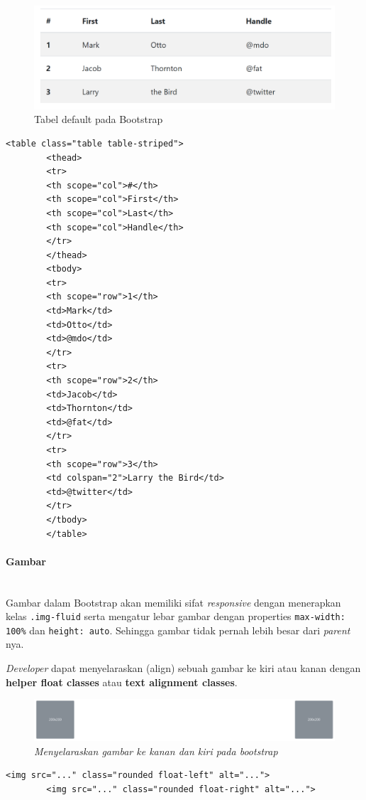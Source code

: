 \documentclass[a4paper,twoside]{article}
\newcommand{\myparagraph}[1]{\paragraph{#1}\mbox{}\\}
\begin{document}
\begin{enumerate}
		\begin{figure} [H]
			\centering  
			\includegraphics[scale=0.7]{tablestriped_bootstrap.png}  
			\caption{Tabel default pada Bootstrap} 
		\end{figure}
		
		\begin{lstlisting}[frame=single] 
		<table class="table table-striped">
		<thead>
		<tr>
		<th scope="col">#</th>
		<th scope="col">First</th>
		<th scope="col">Last</th>
		<th scope="col">Handle</th>
		</tr>
		</thead>
		<tbody>
		<tr>
		<th scope="row">1</th>
		<td>Mark</td>
		<td>Otto</td>
		<td>@mdo</td>
		</tr>
		<tr>
		<th scope="row">2</th>
		<td>Jacob</td>
		<td>Thornton</td>
		<td>@fat</td>
		</tr>
		<tr>
		<th scope="row">3</th>
		<td colspan="2">Larry the Bird</td>
		<td>@twitter</td>
		</tr>
		</tbody>
		</table>
		\end{lstlisting}
		
		
		\myparagraph{Gambar}
		Gambar dalam Bootstrap akan memiliki sifat \textit{responsive} dengan menerapkan kelas \colorbox{mygray}{\texttt{.img-fluid}} serta mengatur lebar gambar dengan properties \colorbox{mygray}{\texttt{max-width: 100\%}} dan \texttt{height: auto}. Sehingga gambar tidak pernah lebih besar dari \textit{parent} nya. 
		
		\textit{Developer} dapat menyelaraskan (align) sebuah gambar ke kiri atau kanan dengan \textbf{helper float classes} atau \textbf{text alignment classes}. 
		\begin{figure} [H]
			\centering  
			\includegraphics[scale=0.7]{imgalign_bootstrap.PNG}  
			\caption{\it{Menyelaraskan gambar ke kanan dan kiri pada bootstrap}} 
		\end{figure}
		\begin{lstlisting}[frame=single]
		<img src="..." class="rounded float-left" alt="...">
		<img src="..." class="rounded float-right" alt="...">
		\end{lstlisting}
		

\end{enumerate}
\end{document}
